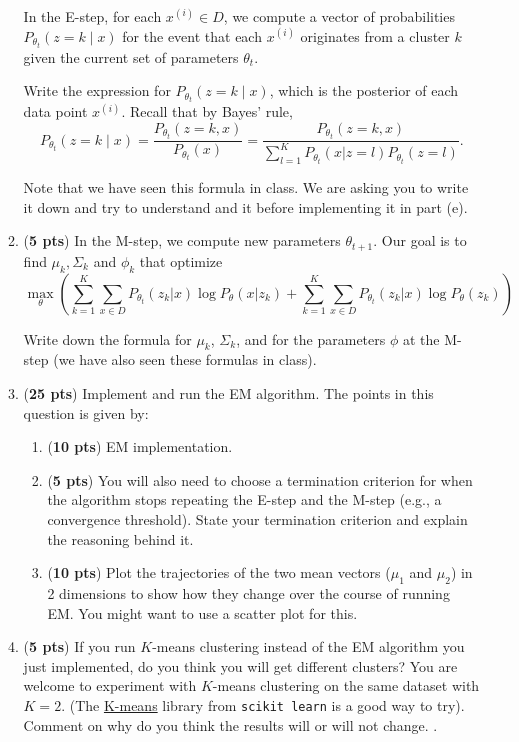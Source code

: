\begin{enumerate}
\begin{enumerate}
In the E-step, for each $x^{(i)} \in D$, we compute a vector of probabilities $P_{\theta_t}(z = k\mid x)$ for the event that each $x^{(i)}$ originates from a cluster $k$ given the current set of parameters $\theta_{t}$. 

Write the expression for $P_{\theta_t}(z = k\mid x)$, which is the posterior of each data point $x^{(i)}$. Recall that by  Bayes' rule, 
$$
P_{\theta_t}(z = k\mid x) 
= \frac{P_{\theta_t}(z=k, x)}{P_{\theta_t}(x)}
= \frac{P_{\theta_t}(z=k, x)}{\sum_{l = 1}^{K} P_{\theta_t}{(x | z = l)} P_{\theta_t}{(z = l)}}.
$$

Note that we have seen this formula in class. We are asking you to write it down and try to understand and it before implementing it in part (e).

\item (\textbf{5 pts})  In the M-step, we compute new parameters $\theta_{t+1}$. Our goal is to find $\mu_k, \Sigma_k$ and $\phi_{k}$ that optimize
$$\max_\theta \left(\sum_{k = 1}^{K} \sum_{x \in D} P_{\theta_t}(z_{k}|x) \log P_{\theta}(x|z_{k}) +  \sum_{k = 1}^{K} \sum_{x \in D} P_{\theta_t}(z_{k}|x) \log P_\theta(z_{k})\right) $$

Write down the formula for $\mu_k$, $\Sigma_k$, and for the parameters $\phi$ at the M-step (we have also seen these formulas in class).

\item (\textbf{25 pts}) Implement and run the EM algorithm. The points in this question is given by:
\begin{enumerate}
    \item (\textbf{10 pts}) EM implementation. 
    \item (\textbf{5 pts}) You will also need to choose a termination criterion for when the algorithm stops repeating the E-step and the M-step (e.g., a convergence threshold). State your termination criterion and explain the reasoning behind it. 
    \item (\textbf{10 pts}) Plot the trajectories of the two mean vectors ($\mu_1$ and $\mu_2$) in 2 dimensions to show how they change over the course of running EM. You might want to use a scatter plot for this.
\end{enumerate} 

\item (\textbf{5 pts}) If you run $K$-means clustering instead of the EM algorithm you just implemented, do you think you will get different clusters? You are welcome to experiment with $K$-means clustering on the same dataset with $K=2$. (The \href{https://scikit-learn.org/stable/modules/generated/sklearn.cluster.KMeans.html}{K-means} library from \texttt{scikit learn} is a good way to try). Comment on why do you think the results will or will not change. .

\end{enumerate}
\end{enumerate}

